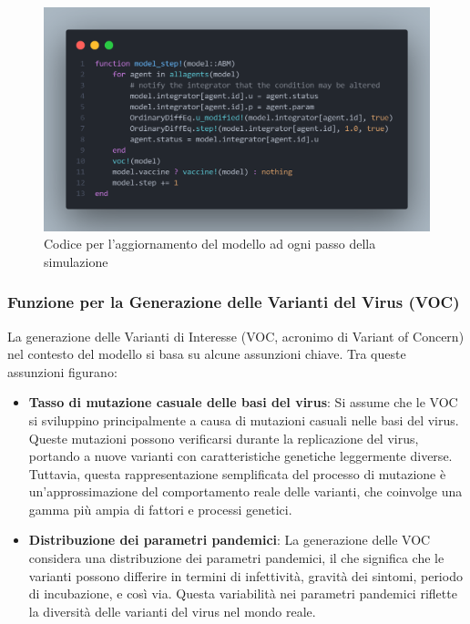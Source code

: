 \begin{figure}[H]
    \begin{center}
		\includegraphics[width=\textwidth]{img/model_step_code.png}
		\caption{Codice per l'aggiornamento del modello ad ogni passo della simulazione}
		\label{fig:model_step_code}
	\end{center}
\end{figure}

\subsubsection{Funzione per la Generazione delle Varianti del Virus (VOC)}

La generazione delle Varianti di Interesse 
(VOC, acronimo di Variant of Concern) nel contesto del modello si 
basa su alcune assunzioni chiave. Tra queste assunzioni figurano:

\begin{itemize}
	\item \textbf{Tasso di mutazione casuale delle basi del virus}: 
	Si assume che le VOC si sviluppino principalmente a causa di 
	mutazioni casuali nelle basi del virus. Queste mutazioni possono 
	verificarsi durante la replicazione del virus, portando a nuove 
	varianti con caratteristiche genetiche leggermente diverse. 
	Tuttavia, questa rappresentazione semplificata del processo di 
	mutazione è un'approssimazione del comportamento reale delle 
	varianti, che coinvolge una gamma più ampia di fattori e processi 
	genetici.
	\item \textbf{Distribuzione dei parametri pandemici}: La generazione 
	delle VOC considera una distribuzione dei parametri pandemici, 
	il che significa che le varianti possono differire in termini di 
	infettività, gravità dei sintomi, periodo di incubazione, e così via. 
	Questa variabilità nei parametri pandemici riflette la diversità 
	delle varianti del virus nel mondo reale.
\end{itemize}

